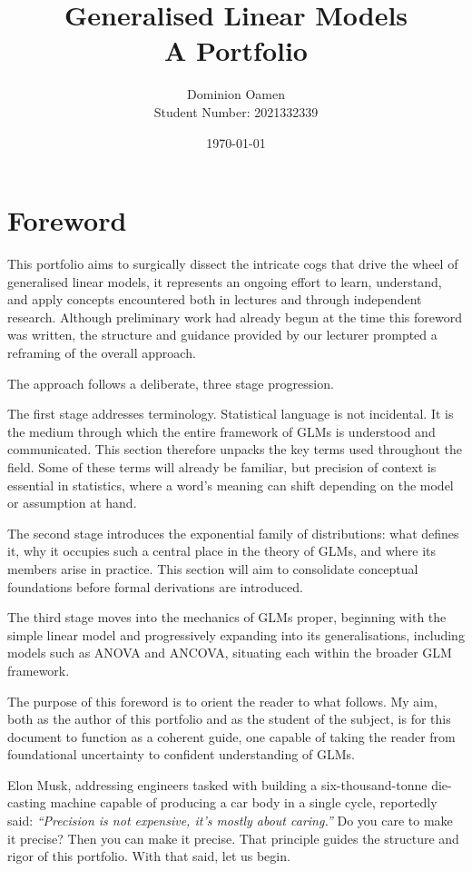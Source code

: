 \documentclass[12pt,a4paper]{report}
\title{\textbf{Generalised Linear Models}\\[0.3cm]\large A Portfolio}
\author{Dominion Oamen\\ Student Number: 2021332339}
\date{\today}
\begin{document}
\maketitle
\thispagestyle{empty}
\newpage

\chapter*{Foreword}

This portfolio aims to surgically dissect the intricate cogs that drive the wheel of generalised linear models, it represents an ongoing effort to learn, understand, and apply concepts encountered both in lectures and through independent research. Although preliminary work had already begun at the time this foreword was written, the structure and guidance provided by our lecturer prompted a reframing of the overall approach.

The approach follows a deliberate, three stage progression.

The first stage addresses terminology. Statistical language is not incidental. It is the medium through which the entire framework of GLMs is understood and communicated. This section therefore unpacks the key terms used throughout the field. Some of these terms will already be familiar, but precision of context is essential in statistics, where a word's meaning can shift depending on the model or assumption at hand.

The second stage introduces the exponential family of distributions: what defines it, why it occupies such a central place in the theory of GLMs, and where its members arise in practice. This section will aim to consolidate conceptual foundations before formal derivations are introduced.

The third stage moves into the mechanics of GLMs proper, beginning with the simple linear model and progressively expanding into its generalisations, including models such as ANOVA and ANCOVA, situating each within the broader GLM framework.

The purpose of this foreword is to orient the reader to what follows. My aim, both as the author of this portfolio and as the student of the subject, is for this document to function as a coherent guide, one capable of taking the reader from foundational uncertainty to confident understanding of GLMs.

Elon Musk, addressing engineers tasked with building a six-thousand-tonne die-casting machine capable of producing a car body in a single cycle, reportedly said: \textit{``Precision is not expensive, it's mostly about caring.''} Do you care to make it precise? Then you can make it precise. That principle guides the structure and rigor of this portfolio. With that said, let us begin.
\end{document}
